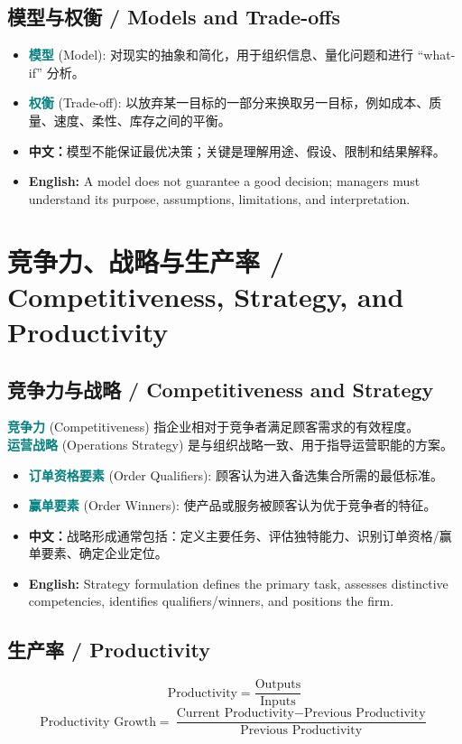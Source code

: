 \documentclass[11pt,a4paper]{ctexart}
\newcommand{\term}[2]{\textbf{\textcolor{Teal}{#1}} \textcolor{Muted}{(#2)}}
\newcommand{\cn}[1]{\textbf{中文：}#1}
\newcommand{\en}[1]{\textbf{English:} #1}
\begin{document}
\subsection{模型与权衡 / Models and Trade-offs}
\begin{itemize}
  \item \term{模型}{Model}: 对现实的抽象和简化，用于组织信息、量化问题和进行 ``what-if'' 分析。
  \item \term{权衡}{Trade-off}: 以放弃某一目标的一部分来换取另一目标，例如成本、质量、速度、柔性、库存之间的平衡。
  \item \cn{模型不能保证最优决策；关键是理解用途、假设、限制和结果解释。}
  \item \en{A model does not guarantee a good decision; managers must understand its purpose, assumptions, limitations, and interpretation.}
\end{itemize}

\section{竞争力、战略与生产率 / Competitiveness, Strategy, and Productivity}

\subsection{竞争力与战略 / Competitiveness and Strategy}
\term{竞争力}{Competitiveness} 指企业相对于竞争者满足顾客需求的有效程度。\\
\term{运营战略}{Operations Strategy} 是与组织战略一致、用于指导运营职能的方案。

\begin{itemize}
  \item \term{订单资格要素}{Order Qualifiers}: 顾客认为进入备选集合所需的最低标准。
  \item \term{赢单要素}{Order Winners}: 使产品或服务被顾客认为优于竞争者的特征。
  \item \cn{战略形成通常包括：定义主要任务、评估独特能力、识别订单资格/赢单要素、确定企业定位。}
  \item \en{Strategy formulation defines the primary task, assesses distinctive competencies, identifies qualifiers/winners, and positions the firm.}
\end{itemize}

\subsection{生产率 / Productivity}
\[
\text{Productivity}=\frac{\text{Outputs}}{\text{Inputs}}
\]
\[
\text{Productivity Growth}=\frac{\text{Current Productivity}-\text{Previous Productivity}}{\text{Previous Productivity}}
\]
\end{document}
